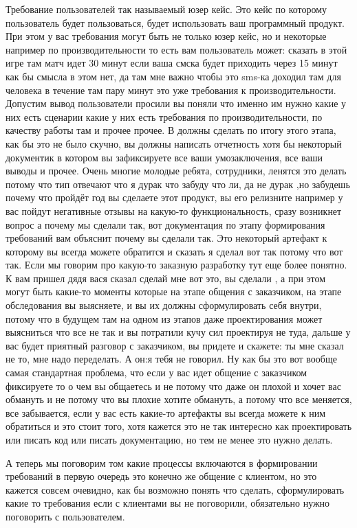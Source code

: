 {Требование пользователей так называемый юзер кейс. Это кейс по которому пользователь будет пользоваться, будет использовать ваш программный продукт. При этом у вас требования могут быть не только юзер кейс, но и некоторые например по производительности то есть вам пользователь может: сказать в этой игре там матч идет 30 минут если ваша смска будет приходить через 15 минут как бы смысла в этом нет, да там мне важно чтобы это sms-ка доходил там для человека в течение там пару минут это уже требования к производительности. Допустим вывод пользователи просили вы поняли что именно им нужно какие у них есть сценарии какие у них есть требования по производительности, по качеству работы там и прочее прочее. В должны сделать по итогу этого этапа, как бы это не было скучно, вы должны написать отчетность хотя бы некоторый документик в котором вы зафиксируете все ваши умозаключения, все ваши выводы и прочее. Очень многие молодые ребята, сотрудники, ленятся это делать потому что тип отвечают что я дурак что забуду что ли, да не дурак ,но забудешь почему что пройдёт год вы сделаете этот продукт, вы его релизните например у вас пойдут негативные отзывы на какую-то функциональность, сразу возникнет вопрос а почему мы сделали так, вот документация по этапу формирования требований вам объяснит почему вы сделали так. Это некоторый артефакт к которому вы всегда можете обратится и сказать я сделал вот так потому что вот так. Если мы говорим про какую-то заказную разработку тут еще более понятно. К вам пришел дядя вася сказал сделай мне вот это, вы сделали , а при этом могут быть какие-то моменты которые на этапе общения с заказчиком, на этапе обследования вы выясняете, и вы их должны сформулировать себя внутри, потому что в будущем там на одном из этапов даже проектирования может выясниться что все не так и вы потратили кучу сил проектируя не туда, дальше у вас будет приятный разговор с заказчиком, вы придете и скажете: ты мне сказал не то, мне надо переделать. А он:я тебя не говорил. Ну как бы это вот вообще самая стандартная проблема, что если у вас идет общение с заказчиком фиксируете то о чем вы общаетесь и не потому что даже он плохой и хочет вас обмануть и не потому что вы плохие хотите обмануть, а потому что все меняется, все забывается, если у вас есть какие-то артефакты вы всегда можете к ним обратиться и это стоит того, хотя кажется это не так интересно как проектировать или писать код или писать документацию,  но тем не менее это нужно делать.

А теперь мы поговорим том какие процессы включаются в формировании требований в первую очередь это конечно же общение с клиентом, но это кажется совсем очевидно, как бы возможно понять что сделать, сформулировать какие то требования если с клиентами вы  не поговорили, обязательно нужно поговорить с пользователем.

}
